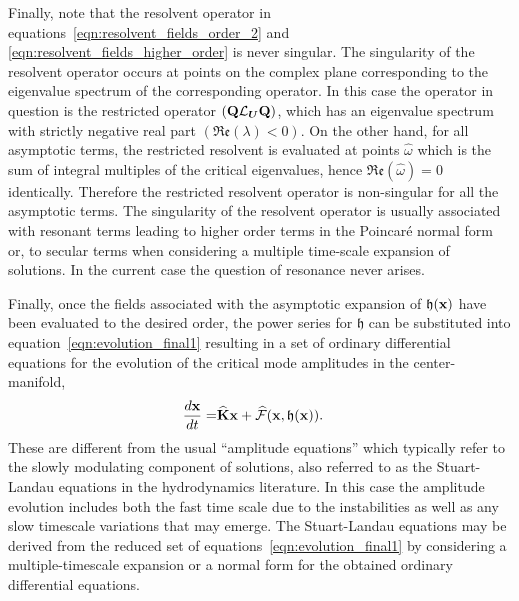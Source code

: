 Finally, note that the resolvent operator in equations~\eqref{eqn:resolvent_fields_order_2} and \eqref{eqn:resolvent_fields_higher_order} is never singular. The singularity of the resolvent operator occurs at points on the complex plane corresponding to the eigenvalue spectrum of the corresponding operator. In this case the operator in question is the restricted operator $(\mathbf{Q}\mathcal{L}_{\boldsymbol{U}}\mathbf{Q})$, which has an eigenvalue spectrum with strictly negative real part $(\mathfrak{Re}(\lambda) < 0)$. On the other hand, for all asymptotic terms, the restricted resolvent is evaluated at points $\widehat{\omega}$ which is the sum of integral multiples of the critical eigenvalues, hence $\mathfrak{Re}(\widehat{\omega}) = 0$ identically. Therefore the restricted resolvent operator is non-singular for all the asymptotic terms. The singularity of the resolvent operator is usually associated with resonant terms leading to higher order terms in the Poincar\'{e} normal form or, to secular terms when considering a multiple time-scale expansion of solutions. In the current case the question of resonance never arises. 

Finally, once the fields associated with the asymptotic expansion of $\mathfrak{h}(\mathbf{x})$ have been evaluated to the desired order, the power series for $\mathfrak{h}$ can be substituted into equation~\eqref{eqn:evolution_final1} resulting in a set of ordinary differential equations for the evolution of the critical mode amplitudes in the center-manifold,
\begin{align}
	\dfrac{d\mathbf{x}}{d t} =& \mathbf{\widehat{K}}\mathbf{x} + \mathcal{\widehat{F}}(\mathbf{x},\mathfrak{h}(\mathbf{x})) \label{eqn:amplitude}.
\end{align}
These are different from the usual ``amplitude equations'' \cite{newell69,cross80,cross09} which typically refer to the slowly modulating component of solutions, also referred to as the Stuart-Landau equations \citep{stuart58,stuart60,sipp07} in the hydrodynamics literature. In this case the amplitude evolution includes both the fast time scale due to the instabilities as well as any slow timescale variations that may emerge. The Stuart-Landau equations may be derived from the reduced set of equations~\eqref{eqn:evolution_final1} by considering a multiple-timescale expansion or a normal form for the obtained ordinary differential equations. 


















